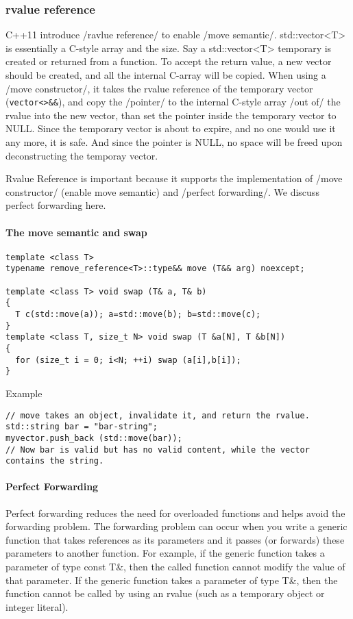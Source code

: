 \subsubsection{rvalue reference}
 C++11 introduce /ravlue reference/ to enable /move semantic/.
 std::vector<T> is essentially a C-style array and the size.
 Say a std::vector<T> temporary is created or returned from a function.
 To accept the return value, a new vector should be created, and all the internal C-array will be copied.
 When using a /move constructor/,
 it takes the rvalue reference of the temporary vector (\verb$vector<>&&$),
 and copy the /pointer/ to the internal C-style array /out of/ the rvalue into the new vector,
 than set the pointer inside the temporary vector to NULL.
 Since the temporary vector is about to expire, and no one would use it any more,
 it is safe.
 And since the pointer is NULL, no space will be freed upon deconstructing the temporay vector.

Rvalue Reference is important because it supports the implementation of /move constructor/ (enable move semantic) and /perfect forwarding/.
We discuss perfect forwarding here.

\paragraph{The move semantic and swap}
\begin{lstlisting}
template <class T>
typename remove_reference<T>::type&& move (T&& arg) noexcept;

template <class T> void swap (T& a, T& b)
{
  T c(std::move(a)); a=std::move(b); b=std::move(c);
}
template <class T, size_t N> void swap (T &a[N], T &b[N])
{
  for (size_t i = 0; i<N; ++i) swap (a[i],b[i]);
}
\end{lstlisting}

Example
\begin{lstlisting}
// move takes an object, invalidate it, and return the rvalue.
std::string bar = "bar-string";
myvector.push_back (std::move(bar));
// Now bar is valid but has no valid content, while the vector contains the string.
\end{lstlisting}

\paragraph{Perfect Forwarding}
Perfect forwarding reduces the need for overloaded functions and helps
avoid the forwarding problem.  The forwarding problem can occur when
you write a generic function that takes references as its parameters
and it passes (or forwards) these parameters to another function.  For
example, if the generic function takes a parameter of type const T\&,
then the called function cannot modify the value of that parameter.
If the generic function takes a parameter of type T\&, then the
function cannot be called by using an rvalue (such as a temporary
object or integer literal).


